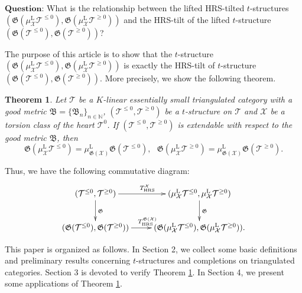 \documentclass[11pt,a4paper]{amsart}
\numberwithin{equation}{section} \theoremstyle{plain}
\newtheorem{thm}[lem]{Theorem}
\numberwithin{equation}{section} \theoremstyle{definition}
\begin{document}
$\mathbf{Question}$: What is the relationship between the lifted HRS-tilted $t$-structures $(\mathfrak{G}(\mu^{\mathrm{L}}_{\mathcal{X}}\mathcal{T}^{\leq0}), \mathfrak{G}(\mu^{\mathrm{L}}_{\mathcal{X}}\mathcal{T}^{\geq0}))$ and the HRS-tilt of the lifted $t$-structure $(\mathfrak{G}(\mathcal{T}^{\leq0}), \mathfrak{G}(\mathcal{T}^{\geq0}))$?

The purpose of this article is to show that the $t$-structure $(\mathfrak{G}(\mu^{\mathrm{L}}_{\mathcal{X}}\mathcal{T}^{\leq0}), \mathfrak{G}(\mu^{\mathrm{L}}_{\mathcal{X}}\mathcal{T}^{\geq0}))$ is exactly the HRS-tilt of $t$-structure $(\mathfrak{G}(\mathcal{T}^{\leq0}), \mathfrak{G}(\mathcal{T}^{\geq0}))$.
More precisely, we show the following theorem.


\begin{thm} \label{thmA} Let $\mathcal{T}$ be a $K$-linear essentially small triangulated category with a good metric $\mathfrak{B}=\{\mathfrak{B}_{n}\}_{n\in\mathbb{N}}$, $(\mathcal{T}^{\leq0},\mathcal{T}^{\geq0})$ be a $t$-structure on $\mathcal{T}$ and $\mathcal{X}$ be a torsion class of the heart $\mathcal{T}^{0}$. If $(\mathcal{T}^{\leq0},\mathcal{T}^{\geq0})$ is extendable with respect to the good metric $\mathfrak{B}$, then
 $$\mathfrak{G}(\mu^{\mathrm{L}}_{\mathcal{X}}\mathcal{T}^{\leq0})=\mu^{\mathrm{L}}_{\mathfrak{G}(\mathcal{X})}\mathfrak{G}(\mathcal{T}^{\leq0}), \ \ \
 \mathfrak{G}(\mu^{\mathrm{L}}_{\mathcal{X}}\mathcal{T}^{\geq0})=\mu^{\mathrm{L}}_{\mathfrak{G}(\mathcal{X})}\mathfrak{G}(\mathcal{T}^{\geq0}).$$
\end{thm}

Thus, we have the following commutative diagram:
\[ \xymatrix{
  (\mathcal{T}^{\leq0}, \mathcal{T}^{\geq0}) \ar[r]^{T_{\mathrm{HRS}}^{\mathcal{X}}}\ar[d]^{\mathfrak{G}} &(\mu^{\mathrm{L}}_{\mathcal{X}}\mathcal{T}^{\leq0},\mu^{\mathrm{L}}_{\mathcal{X}}\mathcal{T}^{\geq0})   \ar[d]^{\mathfrak{G}}  \\
  (\mathfrak{G}(\mathcal{T}^{\leq0}), \mathfrak{G}(\mathcal{T}^{\geq0}))\ar[r]^{T_{\mathrm{HRS}}^{\mathfrak{G}(\mathcal{X})}} &  (\mathfrak{G}(\mu^{\mathrm{L}}_{\mathcal{X}}\mathcal{T}^{\leq0}), \mathfrak{G}(\mu^{\mathrm{L}}_{\mathcal{X}}\mathcal{T}^{\geq0})).
 }\]



This paper is organized as follows. In Section 2, we collect some basic definitions and preliminary results concerning $t$-structures and completions on triangulated categories. Section 3 is devoted to verify Theorem \ref{thmA}. In Section 4, we present some applications of Theorem \ref{thmA}.
\end{document}
